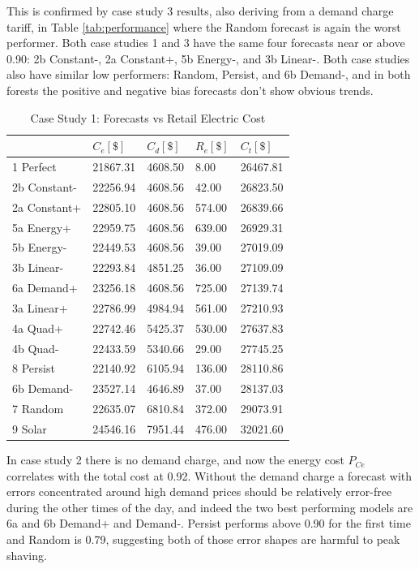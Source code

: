 \documentclass[conference]{IEEEtran}
\begin{document}
This is confirmed by case study 3 results, also deriving from a demand charge tariff, in Table \ref{tab:performance} where the Random forecast is again the worst performer. Both case studies 1 and 3 have the same four forecasts near or above 0.90: 2b Constant-, 2a Constant+, 5b Energy-, and 3b Linear-. Both case studies also have similar low performers: Random, Persist, and 6b Demand-, and in both forests the positive and negative bias forecasts don't show obvious trends.

\begin{table}%
    \centering
    \caption{Case Study 1: Forecasts vs Retail Electric Cost}
    \label{tab:cs1-cost}
    \begin{tabular}{l l l l l}
    \hline
        ~ & $C_e [\$]$ & $C_d [\$]$ & $R_e [\$]$ & $C_t [\$]$ \\ \hline \hline
        1 Perfect & 21867.31 & 4608.50 & 8.00 & 26467.81 \\ \hline
        2b Constant- & 22256.94 & 4608.56 & 42.00 & 26823.50 \\ \hline
        2a Constant+ & 22805.10 & 4608.56 & 574.00 & 26839.66 \\ \hline
        5a Energy+ & 22959.75 & 4608.56 & 639.00 & 26929.31 \\ \hline
        5b Energy- & 22449.53 & 4608.56 & 39.00 & 27019.09 \\ \hline
        3b Linear- & 22293.84 & 4851.25 & 36.00 & 27109.09 \\ \hline
        6a Demand+ & 23256.18 & 4608.56 & 725.00 & 27139.74 \\ \hline
        3a Linear+ & 22786.99 & 4984.94 & 561.00 & 27210.93 \\ \hline
        4a Quad+ & 22742.46 & 5425.37 & 530.00 & 27637.83 \\ \hline
        4b Quad- & 22433.59 & 5340.66 & 29.00 & 27745.25 \\ \hline
        8 Persist & 22140.92 & 6105.94 & 136.00 & 28110.86 \\ \hline
        6b Demand- & 23527.14 & 4646.89 & 37.00 & 28137.03 \\ \hline
        7 Random & 22635.07 & 6810.84 & 372.00 & 29073.91 \\ \hline
        9 Solar & 24546.16 & 7951.44 & 476.00 & 32021.60 \\ \hline
    \end{tabular}
\end{table}

In case study 2 there is no demand charge, and now the energy cost $P_{Ce}$ correlates with the total cost at 0.92. Without the demand charge a forecast with errors concentrated around high demand prices should be relatively error-free during the other times of the day, and indeed the two best performing models are 6a and 6b Demand+ and Demand-. Persist performs above 0.90 for the first time and Random is 0.79, suggesting both of those error shapes are harmful to peak shaving.
\end{document}
